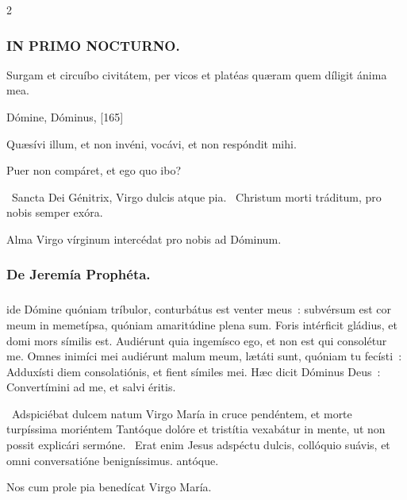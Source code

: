 \documentclass[9pt,twoside]{extarticle}
\begin{document}
\begin{multicols}{2}
{\subsubsection*{\center \textsc{IN PRIMO NOCTURNO.}}
\begin{tightlist}{}
\item {} Surgam et circuíbo civitátem, per vicos et platéas quæram quem díligit ánima mea.
\item {} Dómine, Dóminus,  [165]
\item {} Quæsívi illum, et non invéni, vocávi, et non respóndit mihi.
\item {} Puer non compáret, et ego quo ibo?
\item {}~Sancta Dei Génitrix, Virgo dulcis atque pia. ~Christum morti tráditum, pro nobis semper exóra.
\item {}
\item {\small {} Alma Virgo vírginum intercédat pro nobis ad Dóminum.}
\end{tightlist}

\subsubsection*{\center De Jeremía Prophéta.}
\subsubsection*{\center {}}
ide Dómine quóniam tríbulor, conturbátus est venter meus~: subvérsum est cor meum in memetípsa, quóniam amaritúdine plena sum. Foris intérficit gládius, et domi mors símilis est.
Audiérunt quia ingemísco ego, et non est qui consolétur me. Omnes inimíci mei audiérunt malum meum, lætáti sunt, quóniam tu fecísti~: Adduxísti diem consolatiónis, et fient símiles mei. Hæc dicit Dóminus Deus~: Convertímini ad me, et salvi éritis.

\begin{tightlist}{}
\item {}~Adspiciébat dulcem natum Virgo María in cruce pendéntem, et morte turpíssima moriéntem \textred{*} Tantóque dolóre et tristítia vexabátur in mente, ut non possit explicári sermóne. ~Erat enim Jesus adspéctu dulcis, collóquio suávis, et omni conversatióne benigníssimus. antóque.
\item {\small {} Nos cum prole pia benedícat Virgo María.}
\end{tightlist}

}
\end{multicols}
\end{document}

